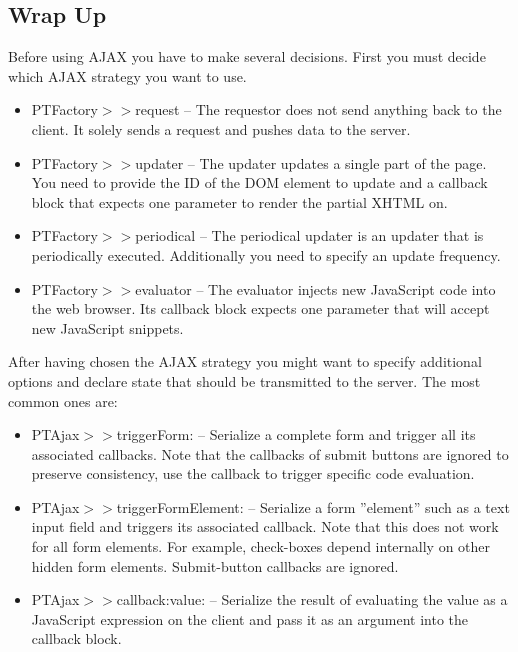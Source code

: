 \documentclass[a4paper,10pt,twoside]{book}
\newcommand{\ct}[1]{{\small\ttfamily\textup{#1}}}
\begin{document}
\subsection{Wrap Up}
\label{book:web20:scriptaculous:ajax:wrapup}

Before using AJAX you have to make several decisions. First you must decide which AJAX strategy you want to use.

\begin{itemize}
\item  \ct{PTFactory$>$$>$request} -- The requestor does not send anything back to the client. It solely sends a request and pushes data to the server. 
\item  \ct{PTFactory$>$$>$updater} -- The updater updates a single part of the page. You need to provide the ID of the DOM element to update and a callback block that expects one parameter to render the partial XHTML on. 
\item  \ct{PTFactory$>$$>$periodical} -- The periodical updater is an updater that is periodically executed. Additionally you need to specify an update frequency. 
\item  \ct{PTFactory$>$$>$evaluator} -- The evaluator injects new JavaScript code into the web browser. Its callback block expects one parameter that will accept new JavaScript snippets. 
\end{itemize}

After having chosen the AJAX strategy you might want to specify additional options and declare state that should be transmitted to the server. The most common ones are:

\begin{itemize}
\item  \ct{PTAjax$>$$>$triggerForm:} -- Serialize a complete form and trigger all its associated callbacks. Note that the callbacks of submit buttons are ignored to preserve consistency, use the callback to trigger specific code evaluation. 
\item  \ct{PTAjax$>$$>$triggerFormElement:} -- Serialize a form ''element'' such as a text input field and triggers its associated callback. Note that this does not work for all form elements. For example, check-boxes depend internally on other hidden form elements. Submit-button callbacks are ignored.  
\item  \ct{PTAjax$>$$>$callback:value:} -- Serialize the result of evaluating the value as a JavaScript expression on the client and pass it as an argument into the callback block. 
\end{itemize}
\end{document}
